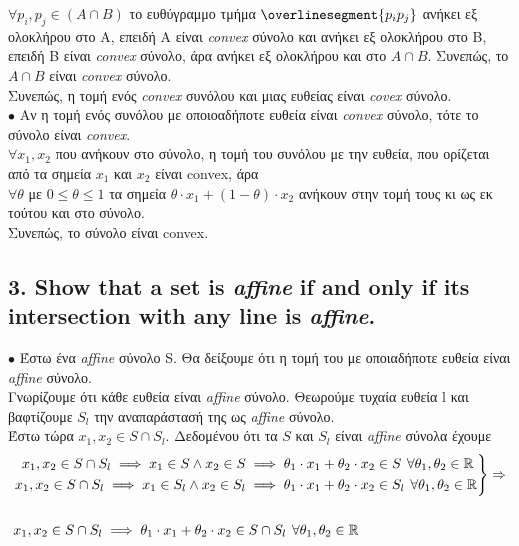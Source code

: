 \documentclass[12pt]{article}
\newcommand{\R}{\mathbb{R}}
\newcommand{\margin}{\hspace{4pt}}
\newenvironment{rcases}
    {\left.\begin{aligned}}
    {\end{aligned}\right\rbrace}
\begin{document}
$\forall p_i, p_j \in (A \cap B)$ το ευθύγραμμο τμήμα $\overlinesegment{p_{i}p_{j}}$ ανήκει εξ ολοκλήρου στο Α, 
επειδή Α είναι \textit{convex} σύνολο και ανήκει εξ ολοκλήρου στο Β, 
επειδή Β είναι \textit{convex} σύνολο, 
άρα ανήκει εξ ολοκλήρου και στο $Α \cap Β$. 
Συνεπώς, το $Α \cap Β$ είναι \textit{convex} σύνολο. \\

Συνεπώς, η τομή ενός \textit{convex} συνόλου και μιας ευθείας είναι \textit{covex} σύνολο. \\

$\bullet$ Aν η τομή ενός συνόλου με οποιοαδήποτε ευθεία είναι \textit{convex} σύνολο, 
τότε το σύνολο είναι \textit{convex}. \\

$\forall x_1, x_2$ που ανήκουν στο σύνολο, η τομή του συνόλου με την ευθεία, 
που ορίζεται από τα  σημεία $x_1$ και $x_2$ είναι convex, άρα \\

$\forall \theta$ με $0 \leq \theta \leq 1$ τα σημεία 
$\theta \cdot x_1 + (1 - \theta) \cdot x_2$ ανήκουν στην τομή τους 
κι ως εκ τούτου και στο σύνολο. \\

Συνεπώς, το σύνολο είναι convex.

\vspace{2in} %

\pagebreak

\subsection*{3. Show that a set is \textit{affine} if and only if its intersection with any line is \textit{affine}.}

$\bullet$ Έστω ένα \textit{affine} σύνολο S. Θα δείξουμε ότι η τομή του με οποιαδήποτε ευθεία είναι \textit{affine} σύνολο.\\

Γνωρίζουμε ότι κάθε ευθεία είναι \textit{affine} σύνολο.
Θεωρούμε τυχαία ευθεία l και βαφτίζουμε $S_l$ την αναπαράστασή της ως \textit{affine} σύνολο.\\

Έστω τώρα $x_1, x_2 \in S \cap S_l$.
Δεδομένου ότι τα $S$ και $S_l$ είναι \textit{affine} σύνολα έχουμε\\

\begin{align*}
    &\begin{rcases}
        x_1, x_2 \in S \cap S_l \implies x_1 \in S \wedge x_2 \in S & \implies \theta_1 \cdot x_1 + \theta_2 \cdot x_2 \in S \margin \forall \theta_1, \theta_2 \in \R\\
        x_1, x_2 \in S \cap S_l \implies x_1 \in S_l \wedge x_2 \in S_l & \implies \theta_1 \cdot x_1 + \theta_2 \cdot x_2 \in S_l \margin \forall \theta_1, \theta_2 \in \R
    \end{rcases}
    \Rightarrow \\ \\
    &x_1, x_2 \in S \cap S_l \implies \theta_1 \cdot x_1 + \theta_2 \cdot x_2 \in S \cap S_l \margin \forall \theta_1, \theta_2 \in \R
\end{align*}
\end{document}
